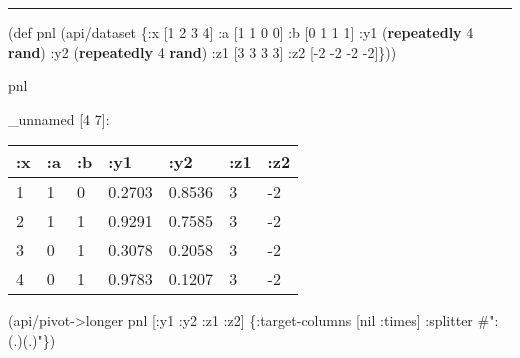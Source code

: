 \documentclass[]{article}
\newenvironment{Shaded}{\begin{snugshade}}{\end{snugshade}}
\newcommand{\KeywordTok}[1]{\textcolor[rgb]{0.13,0.29,0.53}{\textbf{#1}}}
\newcommand{\DecValTok}[1]{\textcolor[rgb]{0.00,0.00,0.81}{#1}}
\newcommand{\SpecialStringTok}[1]{\textcolor[rgb]{0.31,0.60,0.02}{#1}}
\newcommand{\FunctionTok}[1]{\textcolor[rgb]{0.00,0.00,0.00}{#1}}
\newcommand{\VariableTok}[1]{\textcolor[rgb]{0.00,0.00,0.00}{#1}}
\newcommand{\BuiltInTok}[1]{#1}
\newcommand{\AttributeTok}[1]{\textcolor[rgb]{0.77,0.63,0.00}{#1}}
\newcommand{\NormalTok}[1]{#1}
\begin{document}
\begin{center}\rule{0.5\linewidth}{0.5pt}\end{center}

\begin{Shaded}
\begin{Highlighting}[]
\NormalTok{(}\BuiltInTok{def}\FunctionTok{ pnl }\NormalTok{(api/dataset \{}\AttributeTok{:x}\NormalTok{ [}\DecValTok{1} \DecValTok{2} \DecValTok{3} \DecValTok{4}\NormalTok{]}
                       \AttributeTok{:a}\NormalTok{ [}\DecValTok{1} \DecValTok{1} \DecValTok{0} \DecValTok{0}\NormalTok{]}
                       \AttributeTok{:b}\NormalTok{ [}\DecValTok{0} \DecValTok{1} \DecValTok{1} \DecValTok{1}\NormalTok{]}
                       \AttributeTok{:y1}\NormalTok{ (}\KeywordTok{repeatedly} \DecValTok{4} \KeywordTok{rand}\NormalTok{)}
                       \AttributeTok{:y2}\NormalTok{ (}\KeywordTok{repeatedly} \DecValTok{4} \KeywordTok{rand}\NormalTok{)}
                       \AttributeTok{:z1}\NormalTok{ [}\DecValTok{3} \DecValTok{3} \DecValTok{3} \DecValTok{3}\NormalTok{]}
                       \AttributeTok{:z2}\NormalTok{ [-}\DecValTok{2} \DecValTok{-2} \DecValTok{-2} \DecValTok{-2}\NormalTok{]\}))}
\end{Highlighting}
\end{Shaded}

\begin{Shaded}
\begin{Highlighting}[]
\NormalTok{pnl}
\end{Highlighting}
\end{Shaded}

\_unnamed {[}4 7{]}:

\begin{longtable}[]{@{}lllllll@{}}
\toprule
:x & :a & :b & :y1 & :y2 & :z1 & :z2\tabularnewline
\midrule
\endhead
1 & 1 & 0 & 0.2703 & 0.8536 & 3 & -2\tabularnewline
2 & 1 & 1 & 0.9291 & 0.7585 & 3 & -2\tabularnewline
3 & 0 & 1 & 0.3078 & 0.2058 & 3 & -2\tabularnewline
4 & 0 & 1 & 0.9783 & 0.1207 & 3 & -2\tabularnewline
\bottomrule
\end{longtable}

\begin{Shaded}
\begin{Highlighting}[]
\NormalTok{(api/pivot->longer pnl [}\AttributeTok{:y1} \AttributeTok{:y2} \AttributeTok{:z1} \AttributeTok{:z2}\NormalTok{] \{}\AttributeTok{:target-columns}\NormalTok{ [}\VariableTok{nil} \AttributeTok{:times}\NormalTok{]}
                                          \AttributeTok{:splitter} \SpecialStringTok{#":(.)(.)"}\NormalTok{\})}
\end{Highlighting}
\end{Shaded}
\end{document}
